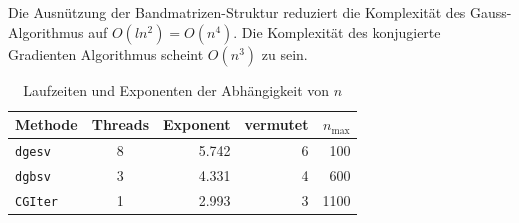 Die Ausnützung der Bandmatrizen-Struktur reduziert die Komplexität des
Gauss-Algorithmus auf $O(ln^2)=O(n^4)$. Die Komplexität des konjugierte
Gradienten Algorithmus scheint $O(n^3)$ zu sein.
\begin{table}
\begin{center}
\begin{tabular}{|l|crrr|}
\hline
Methode&Threads&Exponent&vermutet&$n_{\text{max}}$\\
\hline
{\tt dgesv}&8&5.742&6&100\\
{\tt dgbsv}&3&4.331&4&600\\
{\tt CGIter}&1& 2.993&3&1100\\
\hline
\end{tabular}
\end{center}
\caption{Laufzeiten und Exponenten der Abhängigkeit von $n$\label{results}}
\end{table}
